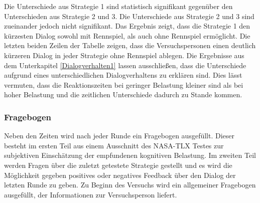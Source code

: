 \documentclass[12pt,a4paper]{scrartcl}
\begin{document}
Die Unterschiede aus Strategie 1 sind statistisch signifikant gegenüber den Unterschieden aus Strategie 2 und 3. Die Unterschiede aus Strategie 2 und 3 sind zueinander jedoch nicht signifikant. Das Ergebnis zeigt, dass die Strategie 1 den kürzesten Dialog sowohl mit Rennspiel, als auch ohne Rennspiel ermöglicht. Die letzten beiden Zeilen der Tabelle zeigen, dass die Versuchspersonen einen deutlich kürzeren Dialog in jeder Strategie ohne Rennspiel ablegen. Die Ergebnisse aus dem Unterkapitel \ref{Dialogverhalten1} lassen ausschließen, dass die Unterschiede aufgrund eines unterschiedlichen Dialogverhaltens zu erklären sind. Dies lässt vermuten, dass die Reaktionszeiten bei geringer Belastung kleiner sind als bei hoher Belastung und die zeitlichen Unterschiede dadurch zu Stande kommen. 
\subsubsection{Fragebogen}
\label{fragebogen}
Neben den Zeiten wird nach jeder Runde ein Fragebogen ausgefüllt. Dieser besteht im ersten Teil aus einem Ausschnitt des NASA-TLX Testes zur subjektiven Einschätzung der empfundenen kognitiven Belastung. Im zweiten Teil werden Fragen über die zuletzt getestete Strategie gestellt und es wird die Möglichkeit gegeben positives oder negatives Feedback über den Dialog der letzten Runde zu geben. Zu Beginn des Versuchs wird ein allgemeiner Fragebogen ausgefüllt, der Informationen zur Versuchsperson liefert. 
\end{document}
